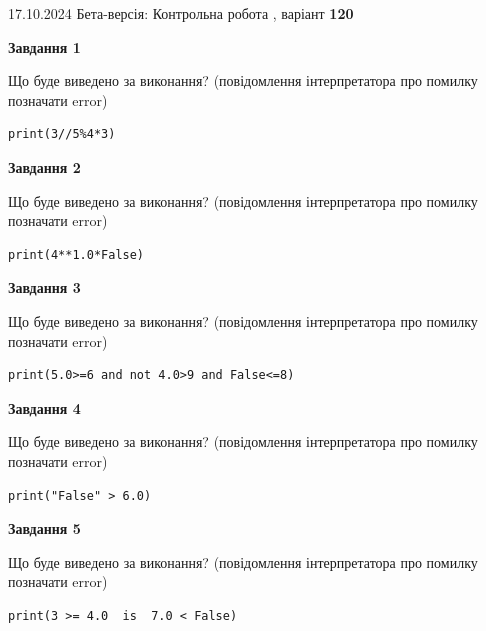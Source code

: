 \documentclass[12pt, ukrainian]{article}
\begin{document}
{\Large{17.10.2024 Бета-версія: Контрольна робота , варіант  \No \textbf { 120 }\par}}
{
\begin {large}
{\begin {center}\textbf{Завдання 1}\end {center}}

Що буде виведено за виконання? (повідомлення інтерпретатора про помилку позначати error)\par
\begin{verbatim}
print(3//5%4*3)
\end{verbatim}

{\begin {center}\textbf{Завдання 2}\end {center}}

Що буде виведено за виконання? (повідомлення інтерпретатора про помилку позначати error)\par
\begin{verbatim}
print(4**1.0*False)
\end{verbatim}

{\begin {center}\textbf{Завдання 3}\end {center}}

Що буде виведено за виконання? (повідомлення інтерпретатора про помилку позначати error)\par
\begin{verbatim}
print(5.0>=6 and not 4.0>9 and False<=8)
\end{verbatim}

{\begin {center}\textbf{Завдання 4}\end {center}}

Що буде виведено за виконання? (повідомлення інтерпретатора про помилку позначати error)\par
\begin{verbatim}
print("False" > 6.0)
\end{verbatim}

{\begin {center}\textbf{Завдання 5}\end {center}}

Що буде виведено за виконання? (повідомлення інтерпретатора про помилку позначати error)\par
\begin{verbatim}
print(3 >= 4.0  is  7.0 < False)
\end{verbatim}


\end{large}}
\end{document}
